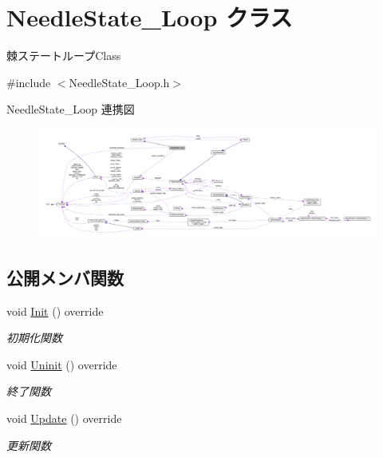 \hypertarget{class_needle_state___loop}{}\section{Needle\+State\+\_\+\+Loop クラス}
\label{class_needle_state___loop}


棘ステートループ\+Class  




{\ttfamily \#include $<$Needle\+State\+\_\+\+Loop.\+h$>$}



Needle\+State\+\_\+\+Loop 連携図\nopagebreak
\begin{figure}[H]
\begin{center}
\leavevmode
\includegraphics[width=350pt]{class_needle_state___loop__coll__graph}
\end{center}
\end{figure}
\subsection*{公開メンバ関数}
\begin{DoxyCompactItemize}
\item 
void \mbox{\hyperlink{class_needle_state___loop_a97f3190ebbbad2943e60f27588b2175d}{Init}} () override
\begin{DoxyCompactList}\small\item\em 初期化関数 \end{DoxyCompactList}\item 
void \mbox{\hyperlink{class_needle_state___loop_a059c3e62fde73c19292eb2510f4ab8fa}{Uninit}} () override
\begin{DoxyCompactList}\small\item\em 終了関数 \end{DoxyCompactList}\item 
void \mbox{\hyperlink{class_needle_state___loop_ace1091782491ee594b53bf08bb9bcf12}{Update}} () override
\begin{DoxyCompactList}\small\item\em 更新関数 \end{DoxyCompactList}\end{DoxyCompactItemize}
